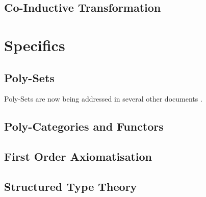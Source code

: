\documentclass[numreferences]{rbjk}
\begin{document}
\begin{article}
\subsection{Co-Inductive Transformation}

\section{Specifics}

\subsection{Poly-Sets}

Poly-Sets are now being addressed in several other documents \cite{rbjp011,rbjt020,rbjMembership}.

\subsection{Poly-Categories and Functors}

\subsection{First Order Axiomatisation}

\subsection{Structured Type Theory}

{\raggedright


} %


\end{article}
\end{document}
